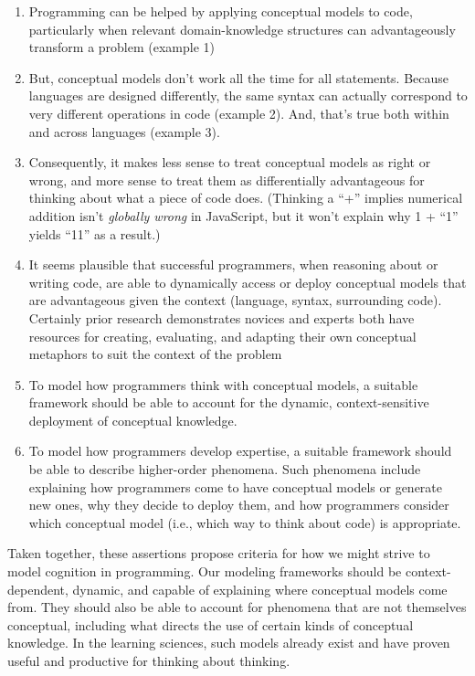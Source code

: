 \begin{enumerate}
\def\labelenumi{\arabic{enumi}.}
\tightlist
\item
  Programming can be helped by applying conceptual models to code,
  particularly when relevant domain-knowledge structures can
  advantageously transform a problem (example 1)
\item
  But, conceptual models don't work all the time for all statements.
  Because languages are designed differently, the same syntax can
  actually correspond to very different operations in code (example 2).
  And, that's true both within and across languages (example 3).
\item
  Consequently, it makes less sense to treat conceptual models as right
  or wrong, and more sense to treat them as differentially advantageous
  for thinking about what a piece of code does. (Thinking a ``+''
  implies numerical addition isn't \emph{globally wrong} in JavaScript,
  but it won't explain why 1 + ``1'' yields ``11'' as a result.)
\item
  It seems plausible that successful programmers, when reasoning about
  or writing code, are able to dynamically access or deploy conceptual
  models that are advantageous given the context (language, syntax,
  surrounding code). Certainly prior research demonstrates novices and experts both have resources for creating, evaluating, and adapting their own conceptual metaphors to suit the context of the problem \cite{hammer_static_2011,izsak_we_2003,izsak_students_2004}
\item
  To model how programmers think with conceptual models, a suitable
  framework should be able to account for the dynamic, context-sensitive
  deployment of conceptual knowledge.
\item
  To model how programmers develop expertise, a suitable framework
  should be able to describe higher-order phenomena. Such phenomena
  include explaining how programmers come to have conceptual models or
  generate new ones, why they decide to deploy them, and how programmers
  consider which conceptual model (i.e., which way to think about code)
  is appropriate.
\end{enumerate}

Taken together, these assertions propose criteria for how we might
strive to model cognition in programming. Our modeling frameworks should
be context-dependent, dynamic, and capable of explaining where
conceptual models come from. They should also be able to account for
phenomena that are not themselves conceptual, including what directs the
use of certain kinds of conceptual knowledge. In the learning sciences,
such models already exist and have proven useful and productive for
thinking about thinking.

